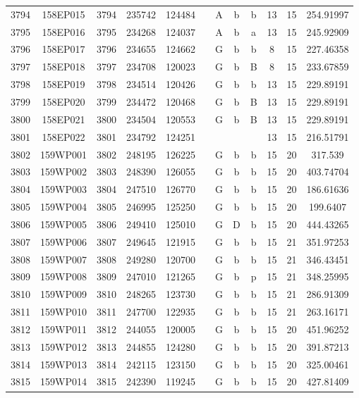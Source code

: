 \begin{tabular}{|*{12}{c|}}
3794 & 158EP015 & 3794 & 235742 & 124484 &  & A & b & b & 13 & 15 & 254.91997 \\ 
3795 & 158EP016 & 3795 & 234268 & 124037 &  & A & b & a & 13 & 15 & 245.92909 \\ 
3796 & 158EP017 & 3796 & 234655 & 124662 &  & G & b & b & 8 & 15 & 227.46358 \\ 
3797 & 158EP018 & 3797 & 234708 & 120023 &  & G & b & B & 8 & 15 & 233.67859 \\ 
3798 & 158EP019 & 3798 & 234514 & 120426 &  & G & b & b & 13 & 15 & 229.89191 \\ 
3799 & 158EP020 & 3799 & 234472 & 120468 &  & G & b & B & 13 & 15 & 229.89191 \\ 
3800 & 158EP021 & 3800 & 234504 & 120553 &  & G & b & B & 13 & 15 & 229.89191 \\ 
3801 & 158EP022 & 3801 & 234792 & 124251 &  &  &  &  & 13 & 15 & 216.51791 \\ 
3802 & 159WP001 & 3802 & 248195 & 126225 &  & G & b & b & 15 & 20 & 317.539 \\ 
3803 & 159WP002 & 3803 & 248390 & 126055 &  & G & b & b & 15 & 20 & 403.74704 \\ 
3804 & 159WP003 & 3804 & 247510 & 126770 &  & G & b & b & 15 & 20 & 186.61636 \\ 
3805 & 159WP004 & 3805 & 246995 & 125250 &  & G & b & b & 15 & 20 & 199.6407 \\ 
3806 & 159WP005 & 3806 & 249410 & 125010 &  & G & D & b & 15 & 20 & 444.43265 \\ 
3807 & 159WP006 & 3807 & 249645 & 121915 &  & G & b & b & 15 & 21 & 351.97253 \\ 
3808 & 159WP007 & 3808 & 249280 & 120700 &  & G & b & b & 15 & 21 & 346.43451 \\ 
3809 & 159WP008 & 3809 & 247010 & 121265 &  & G & b & p & 15 & 21 & 348.25995 \\ 
3810 & 159WP009 & 3810 & 248265 & 123730 &  & G & b & b & 15 & 21 & 286.91309 \\ 
3811 & 159WP010 & 3811 & 247700 & 122935 &  & G & b & b & 15 & 21 & 263.16171 \\ 
3812 & 159WP011 & 3812 & 244055 & 120005 &  & G & b & b & 15 & 20 & 451.96252 \\ 
3813 & 159WP012 & 3813 & 244855 & 124280 &  & G & b & b & 15 & 20 & 391.87213 \\ 
3814 & 159WP013 & 3814 & 242115 & 123150 &  & G & b & b & 15 & 20 & 325.00461 \\ 
3815 & 159WP014 & 3815 & 242390 & 119245 &  & G & b & b & 15 & 20 & 427.81409 \\ 

\end{tabular}
